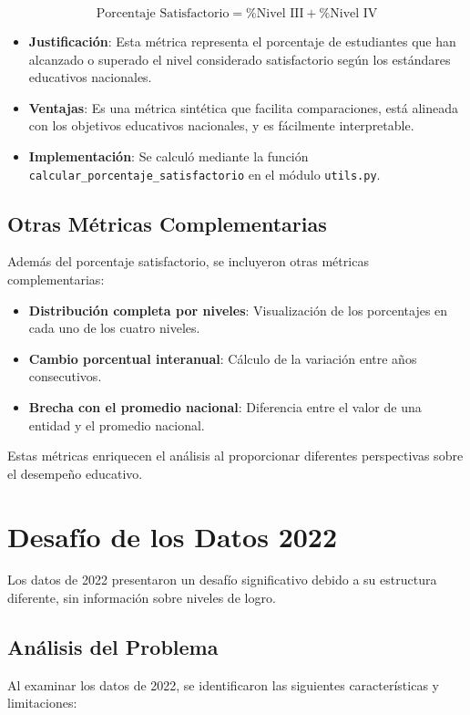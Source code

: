 \begin{equation}
\text{Porcentaje Satisfactorio} = \text{\% Nivel III} + \text{\% Nivel IV}
\end{equation}

\begin{itemize}
    \item \textbf{Justificación}: Esta métrica representa el porcentaje de estudiantes que han alcanzado o superado el nivel considerado satisfactorio según los estándares educativos nacionales.
    \item \textbf{Ventajas}: Es una métrica sintética que facilita comparaciones, está alineada con los objetivos educativos nacionales, y es fácilmente interpretable.
    \item \textbf{Implementación}: Se calculó mediante la función \texttt{calcular\_porcentaje\_satisfactorio} en el módulo \texttt{utils.py}.
\end{itemize}

\subsection{Otras Métricas Complementarias}
Además del porcentaje satisfactorio, se incluyeron otras métricas complementarias:

\begin{itemize}
    \item \textbf{Distribución completa por niveles}: Visualización de los porcentajes en cada uno de los cuatro niveles.
    \item \textbf{Cambio porcentual interanual}: Cálculo de la variación entre años consecutivos.
    \item \textbf{Brecha con el promedio nacional}: Diferencia entre el valor de una entidad y el promedio nacional.
\end{itemize}

Estas métricas enriquecen el análisis al proporcionar diferentes perspectivas sobre el desempeño educativo.

\section{Desafío de los Datos 2022}
Los datos de 2022 presentaron un desafío significativo debido a su estructura diferente, sin información sobre niveles de logro.

\subsection{Análisis del Problema}
Al examinar los datos de 2022, se identificaron las siguientes características y limitaciones:

